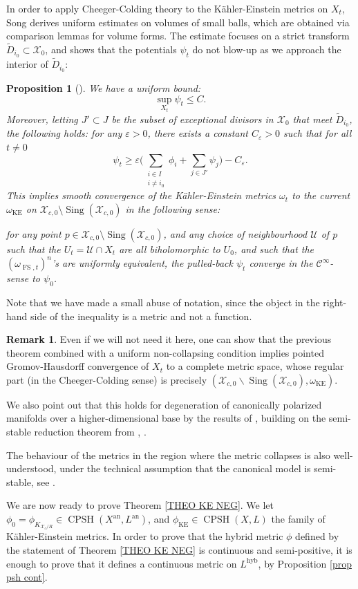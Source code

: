 \documentclass[JEP,XML,SOM,Unicode,published]{cedram}
\let\ts\textstyle
\newtheorem{prop}[equation]{Proposition}
\theoremstyle{definition}
\newtheorem{rem}[equation]{Remark}
\newcommand \U {\mathscr U}
\newcommand \X {\mathscr{X}}
\let\eps\varepsilon
\newcommand{\an}{\mathrm{an}}
\DeclareMathOperator{\CPSH}{CPSH}
\DeclareMathOperator{\FS}{FS}
\newcommand{\hyb}{\mathrm{hyb}}
\DeclareMathOperator{\KE}{KE}
\DeclareMathOperator{\Sing}{Sing}
\begin{document}
In order to apply Cheeger-Colding theory to the Kähler-Einstein metrics on $X_t$, Song derives uniform estimates on volumes of small balls, which are obtained via comparison lemmas for volume forms. The estimate focuses on a strict transform $\tilde{D}_{i_0} \subset \X_0$, and shows that the potentials $\psi_t$ do not blow-up as we approach the interior of $\tilde{D}_{i_0}$:
\begin{prop}[{\cite[Cor.\,4.1, Lem.\,4.2]{Song}}] \label{prop Song}
We have a uniform bound:
\[
\sup_{X_t} \psi_t \le C.
\]
Moreover, letting $J' \subset J$ be the subset of exceptional divisors in $\X_0$ that meet $\tilde{D}_{i_0}$, the following holds: for any $\eps >0$, there exists a constant $C_{\eps} >0$ such that for all $t \neq 0$
\[
\psi_t \ge \eps \bigl(\ts\sum_{\substack{i \in I \\ i \neq i_0}} \phi_i + \sum_{j \in J'} \psi_j \bigr) -C_{\eps}.
\]
This implies smooth convergence of the Kähler-Einstein metrics $\omega_{t}$ to the current $\omega_{\KE}$ on $\X_{c,0} \setminus \Sing(\X_{c,0})$ in the following sense:

for any point $p \in \X_{c,0} \setminus \Sing(\X_{c,0})$, and any choice of neighbourhood $\U$ of $p$ such that the $U_t = \U \cap X_t$ are all biholomorphic to $U_0$, and such that the $(\omega_{\FS,t})^n$'s are uniformly equivalent, the pulled-back $\psi_t$ converge in the $\mathcal{C}^{\infty}$-sense to $\psi_0$.
\end{prop}
Note that we have made a small abuse of notation, since the object in the right-hand side of the inequality is a metric and not a function.
\begin{rem}
Even if we will not need it here, one can show that the previous theorem combined with a uniform non-collapsing condition implies pointed Gromov-Hausdorff convergence of $X_t$ to a complete metric space, whose regular part (in the Cheeger-Colding sense) is precisely $(\X_{c,0} \backslash \Sing(\X_{c,0}), \omega_{\KE})$.

We also point out that this holds for degeneration of canonically polarized manifolds over a higher-dimensional base by the results of \cite{SSW}, building on the semi-stable reduction theorem from \cite{AK}, \cite{ALT}.

The behaviour of the metrics in the region where the metric collapses is also well-understood, under the technical assumption that the canonical model is semi-stable, see \cite{Zh}.
\end{rem}
We are now ready to prove Theorem \ref{THEO KE NEG}. We let $\phi_0 = \phi_{K_{\X_c/R}} \in \CPSH(X^{\an}, L^{\an})$, and $\phi_{\KE} \in \CPSH(X, L)$ the family of Kähler-Einstein metrics. In order to prove that the hybrid metric $\phi$ defined by the statement of Theorem \ref{THEO KE NEG} is continuous and semi-positive, it is enough to prove that it defines a continuous metric on $L^{\hyb}$, by Proposition \ref{prop psh cont}.
\end{document}
